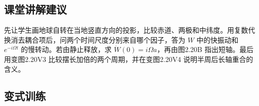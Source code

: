 \documentclass[UTF8,fontset=fandol,a4paper,11pt]{ctexart}
\begin{document}


\subsection*{课堂讲解建议}

先让学生画地球自转在当地竖直方向的投影，比较赤道、两极和中纬度。用复数代换消去耦合项后，问两个时间尺度分别来自哪个因子，答为 $W$ 中的快振动和 $e^{-i\Omega t}$ 的慢转动。若由静止释放，求 $\dot W(0)=i\Omega a$，再由图2.20B 指出短轴。最后用变图2.20V3 比较摆长加倍的两个周期，并在变图2.20V4 说明半周后长轴重合的含义。



\subsection*{变式训练}
\end{document}
